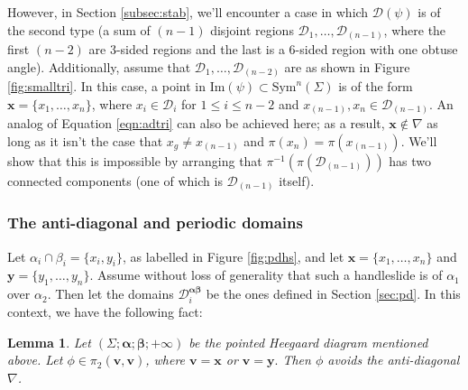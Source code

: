 \documentclass[11pt]{article}
\theoremstyle{plain} \newtheorem{thm}{Theorem}[subsection]
\theoremstyle{plain} \newtheorem{cor}[thm]{Corollary}
\theoremstyle{plain} \newtheorem{prop}[thm]{Proposition}
\theoremstyle{plain} \newtheorem{conj}[thm]{Conjecture}
\theoremstyle{plain} \newtheorem{lem}[thm]{Lemma}
\theoremstyle{definition} \newtheorem{df}[thm]{Definition}
\theoremstyle{remark} \newtheorem{rmk}[thm]{Remark}
\theoremstyle{remark} \newtheorem{obs}[thm]{Observation}
\newcommand{\ba}{\boldsymbol{\alpha}}
\newcommand{\bb}{\boldsymbol{\beta}}
\newcommand{\bx}{\mathbf{x}}
\newcommand{\by}{\mathbf{y}}
\newcommand{\bv}{\mathbf{v}}
\newcommand{\AD}{\nabla}
\begin{document}
However, in Section \ref{subsec:stab}, we'll encounter a case in which $\mathcal{D}(\psi)$ is of the second type (a sum of $(n-1)$ disjoint regions $\mathcal{D}_1, \ldots, \mathcal{D}_{(n-1)}$, where the first $(n-2)$ are 3-sided regions and the last is a 6-sided region with one obtuse angle).  Additionally, assume that $\mathcal{D}_1, \ldots, \mathcal{D}_{(n-2)}$ are as shown in Figure \ref{fig:smalltri}.  In this case, a point in $\text{Im}(\psi) \subset \text{Sym}^n(\Sigma)$ is of the form $\bx = \{ x_1, \ldots, x_n\}$, where $x_i \in \mathcal{D}_i$ for $1 \leq i \leq n-2$ and $x_{(n-1)}, x_n \in \mathcal{D}_{(n-1)}$.  An analog of Equation \ref{eqn:adtri} can also be achieved here; as a result, $\bx \notin \AD$ as long as it isn't the case that $x_{g} \neq x_{(n-1)}$ and $\pi(x_{n}) = \pi(x_{(n-1)})$.  We'll show that this is impossible by arranging that $\pi^{-1} \left( \pi \left( \mathcal{D}_{(n-1)} \right) \right)$ has two connected components (one of which is $\mathcal{D}_{(n-1)}$ itself).

\subsubsection{The anti-diagonal and periodic domains}
Let $\alpha_i \cap \beta_i = \{ x_i, y_i\}$, as labelled in Figure \ref{fig:pdhs}, and let $\bx = \{ x_1, \ldots, x_n \}$ and $\by = \{ y_1, \dots, y_n\}$.  Assume without loss of generality that such a handleslide is of $\alpha_1$ over $\alpha_2$.  Then let the domains $\mathcal{D}_i^{\ba\bb}$ be the ones defined in Section \ref{sec:pd}.  In this context, we have the following fact:

\begin{lem}\label{lem:pdad}
Let $\left( \Sigma; \ba; \bb; +\infty \right)$ be the pointed Heegaard diagram mentioned above.  Let $\phi \in \pi_2\left( \bv, \bv \right)$, where $\bv = \bx$ or $\bv = \by.$  Then $\phi$ avoids the anti-diagonal $\nabla$.
\end{lem}
\end{document}
